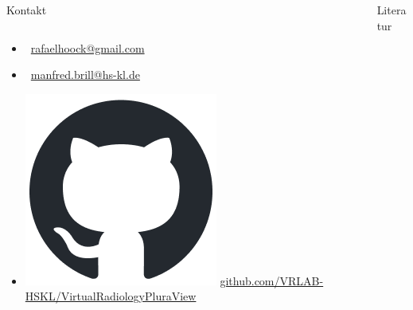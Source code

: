 \documentclass[final,hyperref={pdfpagelabels=false}]{beamer}
\begin{document}
\begin{frame}[t]
\begin{columns}[t]
\begin{column}{.465\textwidth}
\begin{block}{Kontakt}
\begin{columns}[t]
\begin{column}{.6\textwidth}
\vspace*{3.0cm}
\begin{itemize}[leftmargin=0pt]
    \item[] \Letter\ \href{rafaelhoock@gmail.com}{rafaelhoock@gmail.com}
    \item[] \Letter\ \href{manfred.brill@hs-kl.de}{manfred.brill@hs-kl.de}
    \item[] \includegraphics[scale=0.55]{github-mark} \href{https://github.com/VRLAB-HSKL/VirtualRadiologyPluraView}{github.com/VRLAB-HSKL/VirtualRadiologyPluraView}
\end{itemize}
\end{column}
\end{columns}

\end{block}

\end{column} %

\begin{column}{.025\textwidth}\end{column} %

\begin{column}{.465\textwidth}
\nocite{*} %
\begin{block}{Literatur}
 
 
\end{block}







\end{column}
\end{columns}
\end{frame}
\end{document}
